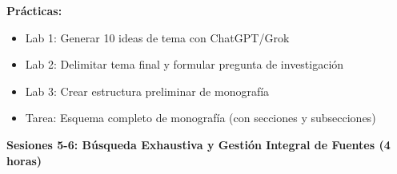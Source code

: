 \documentclass[12pt,a4paper]{yaac-luatex}
\newcommand{\subsecciontitulo}[1]{
	{\color{maincolor}\large\bfseries #1}
}
\begin{document}
\begin{tcolorbox}[
		enhanced,
		colback=white,
		colframe=curso3color,
		arc=3pt,
		boxrule=1.5pt,
		left=10pt,
		right=10pt,
		top=8pt,
		bottom=8pt,
		breakable
		]
		\textbf{Prácticas:}
		\begin{itemize}[leftmargin=*, itemsep=0.1cm]
			\item Lab 1: Generar 10 ideas de tema con ChatGPT/Grok
			\item Lab 2: Delimitar tema final y formular pregunta de investigación
			\item Lab 3: Crear estructura preliminar de monografía
			\item Tarea: Esquema completo de monografía (con secciones y subsecciones)
		\end{itemize}
	\end{tcolorbox}
	
	\vspace{0.3cm}
	
	\begin{tcolorbox}[
		enhanced,
		colback=white,
		colframe=curso3color,
		arc=3pt,
		boxrule=1.5pt,
		left=10pt,
		right=10pt,
		top=8pt,
		bottom=8pt,
		breakable
		]
		\subsecciontitulo{Sesiones 5-6: Búsqueda Exhaustiva y Gestión Integral de Fuentes (4 horas)}
		

\end{tcolorbox}
\end{document}
